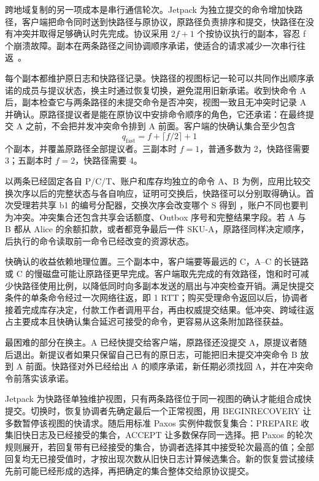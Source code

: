 跨地域复制的另一项成本是串行通信轮次。Jetpack 为独立提交的命令增加快路径，客户端把命令同时送到快路径与原协议，原路径负责排序和提交，快路径在没有冲突并取得足够确认时先完成。协议采用 $2f+1$ 个按协议执行的副本，容忍 f 个崩溃故障。副本在两条路径之间协调顺序承诺，使适合的请求减少一次串行往返~\cite{ch21-jetpack}。

每个副本都维护原日志和快路径记录。快路径的视图标记一轮可以共同作出顺序承诺的成员与提议状态，换主时通过恢复切换，避免混用旧新承诺。收到快命令 A 后，副本检查它与两条路径的未提交命令是否冲突，视图一致且无冲突时记录 A 并确认。原路径提议者是能在原协议中安排命令顺序的角色，它还承诺：在最终提交 A 之前，不会把并发冲突命令排到 A 前面。客户端的快确认集合至少包含
\[
q_{\mathrm{fast}}=f+\lceil f/2\rceil+1
\]
个副本，并覆盖原路径全部提议者。三副本时 $f=1$，普通多数为 2，快路径需要 3；五副本时 $f=2$，快路径需要 4。


以两条已经固定各自 P/C/T、账户和库存均独立的命令 A、B 为例，应用比较交换次序以后的完整状态与各自响应，证明可交换后，快路径可以分别取得确认。首次受理若共享 b1 的编号分配器，交换次序会改变哪个 S 得到 ，账户不同也要判为冲突。冲突集合还包含共享会话额度、Outbox 序号和完整结果字段。若 A 与 B 都从 Alice 的余额扣款，或者都竞争最后一件 SKU-A，原路径同样决定顺序，后执行的命令读取前一命令已经改变的资源状态。

快确认的收益依赖地理位置。三个副本中，客户端要等最远的 C，A--C 的长链路或 C 的慢磁盘可能让原路径更早完成。客户端取先完成的有效路径，饱和时可减少快路径使用比例，以降低同时向多副本发送的扇出与冲突检查开销。满足快提交条件的单条命令经过一次网络往返，即 1 RTT；购买受理命令返回以后，协调者接着完成库存决定，付款工作者调用平台，再由权威提交结果。低冲突、跨域往返占主要成本且快确认集合延迟可接受的命令，更容易从这条附加路径获益。

最困难的部分在换主。A 已经快提交给客户端，原路径还没提交 A，原提议者随后退出。新提议者如果只保留自己已有的原日志，可能把旧未提交冲突命令 B 放到 A 前面。快路径对外已经给出 A 的顺序承诺，新任期必须找回 A，并在冲突命令前落实该承诺。

Jetpack 为快路径单独维护视图，只有两条路径位于同一视图的确认才能组合成快提交。切换时，恢复协调者先确定最后一个正常视图，用 BEGINRECOVERY 让多数暂停该视图的快请求。随后用标准 Paxos 实例仲裁恢复集合：PREPARE 收集旧快日志及已经接受的集合，ACCEPT 让多数保存同一选择。把 Paxos 的轮次规则展开，若回复带有已经接受的集合，协调者选择其中接受轮次最高的值；全部回复均无已接受值时，才按出现次数从旧快日志计算候选集合。新的恢复尝试接续先前可能已经形成的选择，再把确定的集合整体交给原协议提交。

